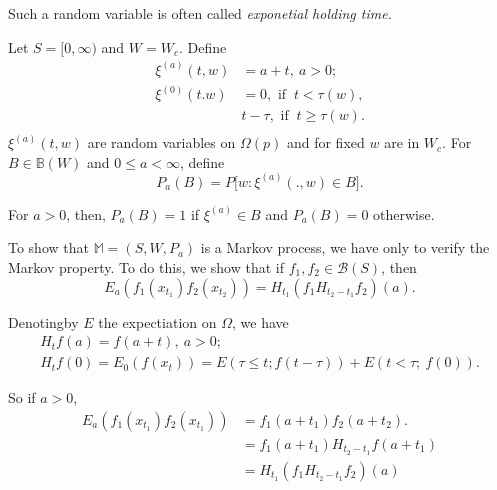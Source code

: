 Such a random variable is often called \textit{exponetial holding
  time.} 

Let $S = \big[ 0, \infty )$ and $W = W_c$. Define
\begin{align*}
  \xi^{(a)} (t,w) &=  a + t, ~ a > 0 ;\\
  \xi^{(0)} (t.w) &=  0, \text{ if } ~ t < \tau (w),\\
  &t- \tau, \text{ if } ~ t \ge \tau (w). \\ 
\end{align*}
 $\xi^{(a)} (t, w)$ are random variables on $\Omega (p)$ and for fixed
$w$ are in $W_c$. For $B \in \mathbb{B} (W)$ and $0 \leq a < \infty$,
define 
 $$
 P_a (B) = P \big [ w : \xi^{(a)} (.,w) \in B \big ].
 $$

For $a > 0$, then, $P_a (B) = 1$ if $ \xi^{(a)} \in B $ and  $P_a (B)
= 0$ otherwise.  

To show that $\mathbb{M} = (S, W, P_a )$ is a Markov process, we have
only to verify the Markov property. To do this, we show that if
$f_1,f_2 \in \mathscr{B} (S)$, then 
$$
E_a (f_1 (x_{t_{1}}) f_2 (x_{t_{2}})) = H_{t_{1}} ( f_1 H_{t_{2}-t_1} f_2) (a).
$$

Denoting\pageoriginale by $E$ the expectiation on $\Omega$, we have 
\begin{gather*}
H_t f (a) = f (a+t), ~ a > 0;\\
H_t f (0) = E_0 (f(x_t)) = E (\tau \leq t; f (t-\tau )) + E (t <
\tau; ~ f(0)).
\end{gather*}

So if $a > 0$,
\begin{align*}
  E_a( f_1 (x_{t_{1}}) f_2 (x_{t_{1}})) &=f_1(a+t_1)f_2(a+t_2).\\ 
  &=f_1(a+t_1)H_{t_2-t_1}f(a+t_1)\\
  &=H_{t_1}(f_1H_{t_2-t_1} f_2)(a)\\
\end{align*}

